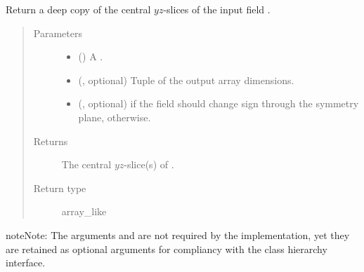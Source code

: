 \documentclass[letterpaper,10pt,english]{sphinxmanual}
\begin{document}
\begin{fulllineitems}

\begin{fulllineitems}
\label{\detokenize{api:dycore.horizontal_boundary_relaxed.RelaxedYZ.from_computational_to_physical_domain}}
Return a deep copy of the central \(yz\)-slices of the input field .
\begin{quote}\begin{description}
\item[{Parameters}] \leavevmode\begin{itemize}
\item {} 
 () \textendash{} A .

\item {} 
 (, optional) \textendash{} Tuple of the output array dimensions.

\item {} 
 (, optional) \textendash{}  if the field should change sign through the symmetry plane,  otherwise.

\end{itemize}

\item[{Returns}] \leavevmode
The central \(yz\)-slice(s) of .

\item[{Return type}] \leavevmode
array\_like

\end{description}\end{quote}

\begin{sphinxadmonition}{note}{Note:}
The arguments  and  are not required by the implementation,
yet they are retained as optional arguments for compliancy with the class hierarchy interface.
\end{sphinxadmonition}

\end{fulllineitems}


\end{fulllineitems}
\end{document}
